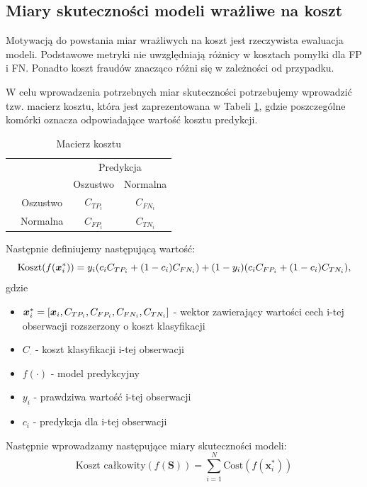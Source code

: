 \documentclass[inzynierska]{pwr_wmat_praca_dyplomowa}
\theoremstyle{plain}
\numberwithin{theorem}{chapter}
\theoremstyle{definition}
\numberwithin{theorem}{chapter}
\begin{document}
\subsection{Miary skuteczności modeli wrażliwe na koszt}

Motywacją do powstania miar wrażliwych na koszt jest rzeczywista ewaluacja modeli. Podstawowe metryki nie uwzględniają różnicy w kosztach pomyłki dla FP i FN. Ponadto koszt fraudów znacząco różni się w zależności od przypadku.

W celu wprowadzenia potrzebnych miar skuteczności potrzebujemy wprowadzić tzw. macierz kosztu, która jest zaprezentowana w Tabeli \ref{macierz-kosztu}, gdzie poszczególne komórki oznacza odpowiadające wartość kosztu predykcji. 
\begin{table}[h]
	\begin{center}
		\makegapedcells
		\begin{tabular}{cc|cc}
			\multicolumn{2}{c}{}     &   \multicolumn{2}{c}{Predykcja} \\
			&            &   Oszustwo &   Normalna     \\ 
			\cline{2-4}
			\multirow{2}{*}{\rotatebox[origin=c]{90}{Prawda}} & Oszustwo   & $C_{TP_{i}}$         & $C_{FN_{i}}$              \\
			& Normalna   & $C_{FP_{i}}$         & $C_{TN_{i}}$              \\ 
			\cline{2-4}
		\end{tabular}
	\end{center}
	\caption{Macierz kosztu}
	\label{macierz-kosztu}
\end{table}
Następnie definiujemy następującą wartość:
$$ \text{Koszt}(f(\boldsymbol{x}_{i}^{*})) = y_i (c_i C_{TP_i} + (1-c_i)C_{FN_i}) + (1-y_i)(c_i C_{FP_i} + (1-c_i)C_{TN_i}) \text{,}$$
gdzie 
\begin{itemize}
	\item $\boldsymbol{x}_{i}^{*} = [\boldsymbol{x}_i, C_{TP_{i}}, C_{FP_{i}}, C_{FN_{i}}, C_{TN_{i}}]$ - wektor zawierający wartości cech i-tej obserwacji rozszerzony o koszt klasyfikacji
	\item $C_{\cdot}$ - koszt klasyfikacji i-tej obserwacji
	\item $f(\cdot)$ - model predykcyjny
	\item $y_i$ - prawdziwa wartość i-tej obserwacji
	\item $c_i$ - predykcja dla i-tej obserwacji
\end{itemize}{}
Następnie wprowadzamy następujące miary skuteczności modeli:
\begin{equation}
	\label{koszt-calkowity}
	\text{Koszt całkowity}(f(\boldsymbol{S})) = \sum_{i=1}^{N}\text{Cost}(f(\boldsymbol{x}_{i}^{*}))
\end{equation} 
\end{document}

